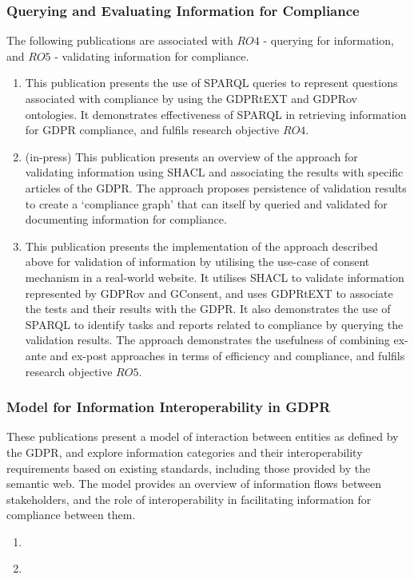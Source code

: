 \subsubsection{Querying and Evaluating Information for Compliance}
The following publications are associated with $RO4$ - querying for information, and $RO5$ - validating information for compliance.
\begin{enumerate}[resume]
    \item \textbf{}
        \newline
        This publication presents the use of SPARQL queries to represent questions associated with compliance by using the GDPRtEXT and GDPRov ontologies.
        It demonstrates effectiveness of SPARQL in retrieving information for GDPR compliance, and fulfils research objective $RO4$.
    \item \textbf{} (in-press)
        \newline
        This publication presents an overview of the approach for validating information using SHACL and associating the results with specific articles of the GDPR. The approach proposes persistence of validation results to create a `compliance graph' that can itself by queried and validated for documenting information for compliance.
    \item \textbf{}
        \newline
        This publication presents the implementation of the approach described above for validation of information by utilising the use-case of consent mechanism in a real-world website. It utilises SHACL to validate information represented by GDPRov and GConsent, and uses GDPRtEXT to associate the tests and their results with the GDPR. It also demonstrates the use of SPARQL to identify tasks and reports related to compliance by querying the validation results. The approach demonstrates the usefulness of combining ex-ante and ex-post approaches in terms of efficiency and compliance, and fulfils research objective $RO5$.
\end{enumerate}

\subsubsection{Model for Information Interoperability in GDPR}
These publications present a model of interaction between entities as defined by the GDPR, and explore information categories and their interoperability requirements based on existing standards, including those provided by the semantic web.
The model provides an overview of information flows between stakeholders, and the role of interoperability in facilitating information for compliance between them.
\begin{enumerate}[resume]
    \item \textbf{}
    \item \textbf{}
\end{enumerate}

